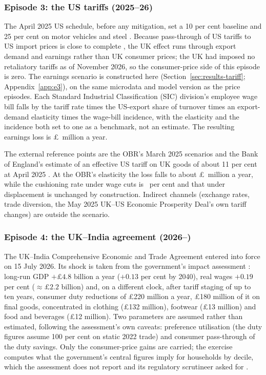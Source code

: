 \subsubsection{Episode 3: the US tariffs (2025--26)}

The April 2025 US schedule, before any mitigation, set a 10 per cent
baseline and 25 per cent on motor vehicles and steel
\citep{boempr2025}. Because
pass-through of US tariffs to US import prices is close to complete
\citep{amitireddingweinstein2019, fajgelbaumetal2020, cavalloetal2021},
the UK effect runs through export demand and earnings rather than UK
consumer prices; the UK had imposed no retaliatory tariffs as of
November 2026, so the consumer-price side of this episode is zero. The
earnings scenario is constructed here
(Section~\ref{sec:results-tariff}; Appendix~\ref{app:e3}), on the same
microdata and model version as the price episodes. Each Standard Industrial Classification (SIC) division's
employee wage bill falls by the tariff rate times the US-export share
of turnover times an export-demand elasticity times the wage-bill
incidence, with the elasticity and the incidence both set to one as a
benchmark, not an estimate. The resulting earnings loss is
\pounds\MsUSTariffGrossShockMillions\ million a year.

The external reference points are the OBR's March 2025 scenarios
\citep[import-demand elasticity 0.4; peak GDP effects of $-0.6$ to
$-1.0$ per cent;][]{obr2025} and the Bank of England's estimate of an
effective US tariff on UK goods of about 11 per cent at April 2025
\citep{boempr2025}. At the OBR's elasticity the loss falls to about
\pounds\EThreeObrLowWageGrossM\ million a year, while the cushioning
rate under wage cuts is \EThreeObrLowWageRatePct\ per cent and that under
displacement is unchanged by construction. Indirect channels (exchange rates,
trade diversion, the May 2025 UK--US Economic Prosperity Deal's own tariff changes)
are outside the scenario.

\subsubsection{Episode 4: the UK--India agreement (2026--)}

The UK--India Comprehensive Economic and Trade Agreement entered into
force on 15 July 2026. Its shock is taken from the government's impact
assessment \citep{dbtindia2026}: long-run GDP $+\pounds 4.8$ billion a
year ($+0.13$ per cent by 2040), real wages $+0.19$ per cent
($\approx\pounds 2.2$ billion) and, on a different clock, after tariff
staging of up to ten years, consumer duty reductions of \pounds 220
million a year, \pounds 180 million of it on final goods, concentrated
in clothing (\pounds 132 million), footwear (\pounds 13 million) and
food and beverages (\pounds 12 million). Two parameters are assumed
rather than estimated, following the assessment's own caveats:
preference utilisation (the duty figures assume 100 per cent on static
2022 trade) and consumer pass-through of the duty savings. Only the
consumer-price gains are carried; the exercise computes what the
government's central figures imply for households by decile, which the
assessment does not report and its regulatory scrutineer asked for
\citep{rpc2025}.
